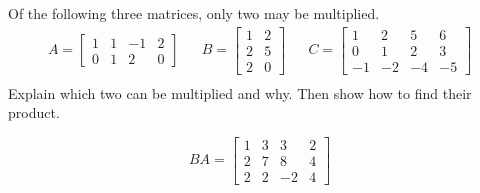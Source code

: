 
\begin{exerciseStatement}


Of the following three matrices, only two may be multiplied. 
\begin{align*} A= \left[\begin{array}{cccc}
1 & 1 & -1 & 2 \\
0 & 1 & 2 & 0
\end{array}\right]  & & B= \left[\begin{array}{cc}
1 & 2 \\
2 & 5 \\
2 & 0
\end{array}\right]  & & C= \left[\begin{array}{cccc}
1 & 2 & 5 & 6 \\
0 & 1 & 2 & 3 \\
-1 & -2 & -4 & -5
\end{array}\right]  \\ \end{align*}
             Explain which two can be multiplied and why. Then show how to find their product.


\end{exerciseStatement}
    
\begin{exerciseAnswer} 
\[BA= \left[\begin{array}{cccc}
1 & 3 & 3 & 2 \\
2 & 7 & 8 & 4 \\
2 & 2 & -2 & 4
\end{array}\right] \]
\end{exerciseAnswer}
    
